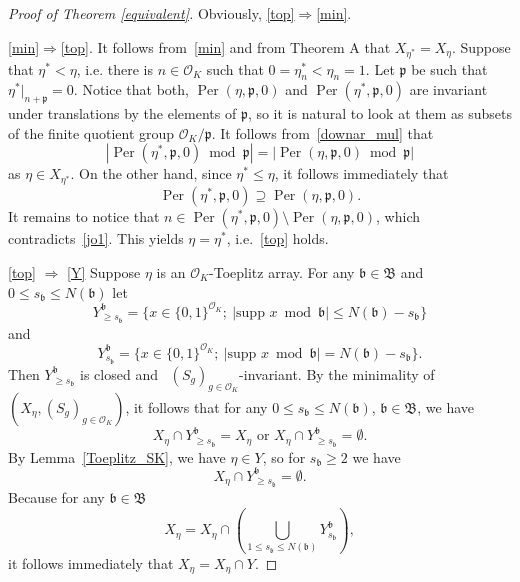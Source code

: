 \documentclass[leqno,a4paper,12pt]{article}
\theoremstyle{definition}
\newcommand{\Per}{\operatorname{Per}\nolimits}
\newcommand{\OK}{\mathcal{O}_K}
\begin{document}
\begin{proof}[Proof of Theorem \ref{equivalent}]
Obviously, \eqref{top}$\Rightarrow$\eqref{min}.

\eqref{min}$\Rightarrow$\eqref{top}. It follows from~\eqref{min} and from Theorem A that $X_{\eta^*}=X_\eta$. Suppose that $\eta^*<\eta$, i.e. there is $n\in\OK$ such that $0=\eta^*_n<\eta_n=1$. Let $\mathfrak{p}$ be such that $\eta^*|_{n+\mathfrak{p}}=0$. Notice that both, $\Per(\eta,\mathfrak{p},0)$ and $\Per(\eta^*,\mathfrak{p},0)$ are invariant under translations by the elements of $\mathfrak{p}$, so it is natural to look at them as subsets of the finite quotient group $\OK/\mathfrak{p}$. It follows from~\eqref{downar_mul} that
\begin{equation}\label{jo1}
|\Per(\eta^*,\mathfrak{p},0)\bmod \mathfrak{p}|=|\Per(\eta,\mathfrak{p},0)\bmod \mathfrak{p}|
\end{equation}
as $\eta\in X_{\eta^*}$. On the other hand, since $\eta^*\leq \eta$, it follows immediately that
\[
\Per(\eta^*,\mathfrak{p},0)\supseteq \Per(\eta,\mathfrak{p},0).
\]
It remains to notice that $n\in\Per(\eta^*,\mathfrak{p},0)\setminus \Per(\eta,\mathfrak{p},0)$, which contradicts~\eqref{jo1}. This yields $\eta=\eta^*$, i.e.~\eqref{top} holds.

\eqref{top} $\Rightarrow$ \eqref{Y} Suppose $\eta$ is an $\OK$-Toeplitz array. For any $\mathfrak{b}\in\mathfrak{B}$ and~$0\leq s_\mathfrak{b}\leq N(\mathfrak{b})$ let \[Y^\mathfrak{b}_{\geq s_{\mathfrak{b}}}=\{x\in \{0,1\}^{\OK};\ |\text{supp }x\bmod \mathfrak{b}|\leq N(\mathfrak{b})-s_\mathfrak{b}\}\] and \[Y^\mathfrak{b}_{s_\mathfrak{b}}=\{x\in \{0,1\}^{\OK};\ |\text{supp }x\bmod \mathfrak{b}|=N(\mathfrak{b})-s_\mathfrak{b}\}.\] Then $Y^\mathfrak{b}_{\geq s_{\mathfrak{b}}}$ is closed and ~$(S_g)_{g\in\OK}$-invariant. By the minimality of $(X_\eta,(S_g)_{g\in\OK})$, it follows that for any $0\leq s_\mathfrak{b}\leq N(\mathfrak{b})$, $\mathfrak{b}\in\mathfrak{B}$, we have
\[
X_\eta \cap Y^\mathfrak{b}_{\geq s_{\mathfrak{b}}}=X_\eta\text{ or }X_\eta \cap Y^\mathfrak{b}_{\geq s_{\mathfrak{b}}}=\emptyset.
\]
By Lemma~\ref{Toeplitz_SK}, we have $\eta\in Y$, so for $s_\mathfrak{b}\geq 2$ we have \[X_\eta \cap Y^\mathfrak{b}_{\geq s_\mathfrak{b}}=\emptyset.\] Because for any $\mathfrak{b}\in\mathfrak{B}$ \[X_\eta=X_\eta \cap \left(\bigcup_{1\leq s_\mathfrak{b}\leq N(\mathfrak{b})}Y^\mathfrak{b}_{s_\mathfrak{b}}\right),\] it follows immediately that $X_\eta=X_\eta\cap Y$.



\end{proof}
\end{document}
